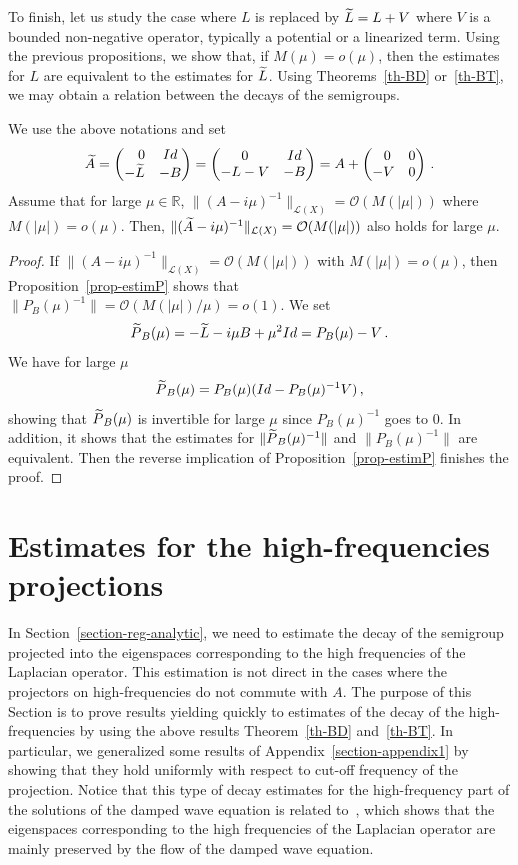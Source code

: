 \documentclass[10pt]{amsart}
\theoremstyle{definition}\newtheorem{defi}[theo]{Definition}\newtheorem{rema}[theo]{Remark}\newtheorem{exam}[theo]{Example}\newtheorem{exem}[theo]{Example}\newtheorem{nota}[theo]{Notation}
\newcommand{\RR}{\mathbb{R}}
\newcommand{\Lc}{\mathcal{L}}
\newcommand{\Oc}{\mathcal{O}}
\let\oldtilde\tilde
\renewcommand*{\tilde}[1]{\mathchoice{\widetilde{#1}}{\widetilde{#1}}{\oldtilde{#1}}{\oldtilde{#1}}}\let\oldexists\exists
\renewcommand*{\exists}{\mathrel{\oldexists}}
\begin{document}
To finish, let us study the case where $L$ is replaced by $\tilde L=L+V$ where $V$ is a bounded non-negative operator, typically a potential or a linearized term. Using the previous propositions, we show that, if $M(\mu)=o(\mu)$, then the estimates for $L$ are equivalent to the estimates for $\tilde L$. Using Theorems~\ref{th-BD} or~\ref{th-BT}, we may obtain a relation between the decays of the semigroups.

\begin{prop}\label{prop-appendix-linearized}
We use the above notations and set
\[
\tilde A=
\begin{pmatrix}
\quad 0 & Id \\ -\tilde L & -B
\end{pmatrix}=
\begin{pmatrix}
0 & Id \\ -L-V & -B
\end{pmatrix}=
A +\begin{pmatrix}
\;\;0 & 0 \\ -V & 0
\end{pmatrix}\,.
\]
Assume that for large $\mu\in\RR$, $\|(A-i\mu)^{-1}\|_{\Lc(X)} = \Oc (M(|\mu|))$ where $M(|\mu|)=o(\mu)$. Then, $\|(\tilde A-i\mu)^{-1}\|_{\Lc(X)} = \Oc (M(|\mu|))$ also holds for large $\mu$.
\end{prop}
\begin{proof}
If $\|(A-i\mu)^{-1}\|_{\Lc(X)} = \Oc (M(|\mu|))$ with $M(|\mu|)=o(\mu)$, then Proposition~\ref{prop-estimP} shows that $\|P_B(\mu)^{-1}\|=\Oc(M(|\mu|)/\mu)=o(1)$. We set
\[
\tilde P_B(\mu)= -\tilde L-i\mu B +\mu^2 Id = P_B(\mu)-V\,.
\]
We have for large $\mu$
\[
\tilde P_B(\mu)=P_B(\mu)(Id-P_B(\mu)^{-1} V)\,,
\]
showing that $\tilde P_B(\mu)$ is invertible for large $\mu$ since $P_B(\mu)^{-1}$ goes to $0$. In addition, it shows that the estimates for $\|\tilde P_B(\mu)^{-1}\|$ and $\|P_B(\mu)^{-1}\|$ are equivalent. Then the reverse implication of Proposition~\ref{prop-estimP} finishes the proof.
\end{proof}



\section{Estimates for the high-frequencies projections}\label{section-appendix2}
In Section~\ref{section-reg-analytic}, we need to estimate the decay of the semigroup projected into the eigenspaces corresponding to the high frequencies of the Laplacian operator. This estimation is not direct in the cases where the projectors on high-frequencies do not commute with $A$. The purpose of this Section is to prove results yielding quickly to estimates of the decay of the high-frequencies by using the above results Theorem~\ref{th-BD} and~\ref{th-BT}. In particular, we generalized some results of Appendix~\ref{section-appendix1} by showing that they hold uniformly with respect to cut-off frequency of the projection. Notice that this type of decay estimates for the high-frequency part of the solutions of the damped wave equation is related to~\cite[Theorem~10]{Burq-Lebeau}, which shows that the eigenspaces corresponding to the high frequencies of the Laplacian operator are mainly preserved by the flow of the damped wave equation.
\end{document}
